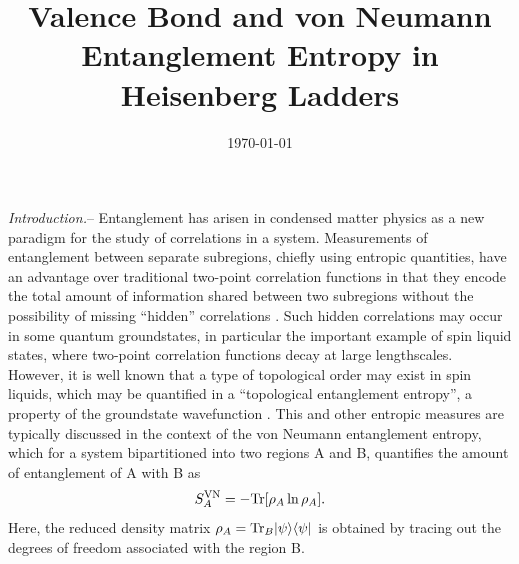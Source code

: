 \documentclass[prl,aps,twocolumn,floatfix,amsmath,amssymb,superscriptaddress,tightenlines]{revtex4}
\begin{document}
\date{\today}
\title{Valence Bond and von Neumann Entanglement Entropy in Heisenberg Ladders}


\begin{abstract}

\end{abstract}
\maketitle


{\it Introduction.}-- Entanglement has arisen in condensed matter physics as a new paradigm for the study of correlations in a system.  Measurements of entanglement between separate subregions, chiefly using entropic quantities, have an advantage over traditional two-point correlation functions in that they encode the total amount of information shared between two subregions without the possibility of missing ``hidden'' correlations \cite{wolf}.  Such hidden correlations may occur in some quantum groundstates,  in particular the important example of spin liquid states, where two-point correlation functions decay at large lengthscales.  However, it is well known that a type of topological order may exist in spin liquids, which may be quantified in a ``topological entanglement entropy'', a property of the groundstate wavefunction \cite{ KP, LW}.  This and other entropic measures are typically discussed in the context of the von Neumann entanglement entropy, which for a system bipartitioned into two regions A and B, quantifies the amount of entanglement of A with B as
\begin{equation}
S^{\rm VN}_A = - {\rm Tr} [ \rho_A \ln \rho_A ].
\end{equation}
Here, the reduced density matrix $\rho_A = {\rm Tr}_B | \psi \rangle \langle \psi |$ is obtained by tracing out the degrees of freedom associated with the region B.
\end{document}
